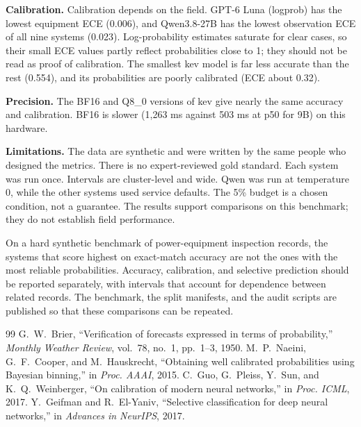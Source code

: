\documentclass[10pt,twocolumn,letterpaper]{article}
\makeatletter
\renewcommand\section{\@startsection{section}{1}{\z@}{8pt plus 2pt minus 1pt}{4pt}{\normalfont\small\bfseries\MakeUppercase}}
\makeatother
\begin{document}
\textbf{Calibration.} Calibration depends on the field. GPT-6 Luna (logprob) has the lowest equipment ECE (0.006), and Qwen3.8-27B has the lowest observation ECE of all nine systems (0.023). Log-probability estimates saturate for clear cases, so their small ECE values partly reflect probabilities close to 1; they should not be read as proof of calibration. The smallest kev model is far less accurate than the rest (0.554), and its probabilities are poorly calibrated (ECE about 0.32).

\textbf{Precision.} The BF16 and Q8\_0 versions of kev give nearly the same accuracy and calibration. BF16 is slower (1,263 ms against 503 ms at p50 for 9B) on this hardware.

\textbf{Limitations.} The data are synthetic and were written by the same people who designed the metrics. There is no expert-reviewed gold standard. Each system was run once. Intervals are cluster-level and wide. Qwen was run at temperature 0, while the other systems used service defaults. The 5\% budget is a chosen condition, not a guarantee. The results support comparisons on this benchmark; they do not establish field performance.

\section{Conclusion}
On a hard synthetic benchmark of power-equipment inspection records, the systems that score highest on exact-match accuracy are not the ones with the most reliable probabilities. Accuracy, calibration, and selective prediction should be reported separately, with intervals that account for dependence between related records. The benchmark, the split manifests, and the audit scripts are published so that these comparisons can be repeated.

\begin{thebibliography}{99}
 G.~W.~Brier, ``Verification of forecasts expressed in terms of probability,'' \emph{Monthly Weather Review}, vol.~78, no.~1, pp.~1--3, 1950.
 M.~P.~Naeini, G.~F.~Cooper, and M.~Hauskrecht, ``Obtaining well calibrated probabilities using Bayesian binning,'' in \emph{Proc. AAAI}, 2015.
 C.~Guo, G.~Pleiss, Y.~Sun, and K.~Q.~Weinberger, ``On calibration of modern neural networks,'' in \emph{Proc. ICML}, 2017.
 Y.~Geifman and R.~El-Yaniv, ``Selective classification for deep neural networks,'' in \emph{Advances in NeurIPS}, 2017.
\end{thebibliography}
\end{document}
